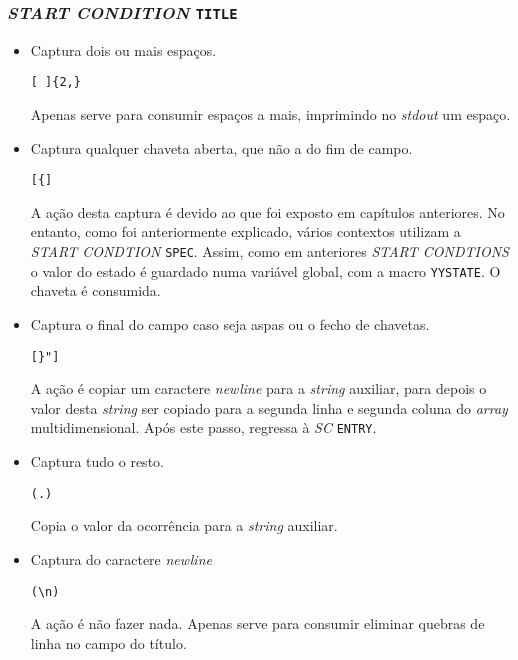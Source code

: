 \subsubsection{\emph{START CONDITION} \texttt{TITLE}}

\begin{itemize}
\item Captura dois ou mais espaços.
\begin{verbatim}
[ ]{2,}
\end{verbatim}

Apenas serve para consumir espaços a mais, imprimindo no \emph{stdout} um espaço.

\item Captura qualquer chaveta aberta, que não a do fim de campo.
\begin{verbatim}
[{]
\end{verbatim}

A ação desta captura é devido ao que foi exposto em capítulos anteriores. No
entanto, como foi anteriormente explicado, vários contextos utilizam
a \emph{START CONDTION} \texttt{SPEC}. Assim, como em anteriores \emph{START
CONDTIONS} o valor do estado é guardado numa variável global, com a macro
\texttt{YYSTATE}. O chaveta é consumida.

\item Captura o final do campo caso seja aspas ou o fecho de chavetas.
\begin{verbatim}
[}"] 
\end{verbatim}
A ação é copiar um caractere \emph{newline} para a \emph{string} auxiliar, para
depois o valor desta \emph{string} ser copiado para a segunda linha e segunda
coluna do \emph{array} multidimensional. Após este passo, regressa à \emph{SC}
\texttt{ENTRY}.


\item Captura tudo o resto.
\begin{verbatim}
(.)
\end{verbatim}

Copia o valor da ocorrência para a \emph{string} auxiliar.

\item Captura do caractere \emph{newline}
\begin{verbatim}
(\n)
\end{verbatim}

A ação é não fazer nada. Apenas serve para consumir eliminar quebras de linha no
campo do título.


\end{itemize}

